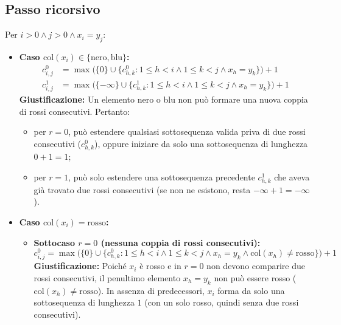 \subsection{Passo ricorsivo}
Per $i > 0 \land j > 0 \land x_i = y_j$:
\begin{itemize}
    \item \textbf{Caso $\text{col}(x_i) \in \{\text{nero}, \text{blu}\}$:}
    \begin{align*}
        c_{i,j}^0 &= \max \Big( \{0\} \cup \{ c_{h,k}^0 : 1 \le h < i \land 1 \le k < j \land x_h = y_k \} \Big) + 1 \\
        c_{i,j}^1 &= \max \Big( \{-\infty\} \cup \{ c_{h,k}^1 : 1 \le h < i \land 1 \le k < j \land x_h = y_k \} \Big) + 1
    \end{align*}
    \textbf{Giustificazione:} Un elemento nero o blu non può formare una nuova coppia di rossi consecutivi. Pertanto:
    \begin{itemize}
        \item per $r = 0$, può estendere qualsiasi sottosequenza valida priva di due rossi consecutivi ($c_{h,k}^0$), oppure iniziare da solo una sottosequenza di lunghezza $0 + 1 = 1$;
        \item per $r = 1$, può solo estendere una sottosequenza precedente $c_{h,k}^1$ che aveva già trovato due rossi consecutivi (se non ne esistono, resta $-\infty + 1 = -\infty$).
    \end{itemize}

    \item \textbf{Caso $\text{col}(x_i) = \text{rosso}$:}
    \begin{itemize}
        \item \textbf{Sottocaso $r = 0$ (nessuna coppia di rossi consecutivi):}
        \[
            c_{i,j}^0 = \max \Big( \{0\} \cup \{ c_{h,k}^0 : 1 \le h < i \land 1 \le k < j \land x_h = y_k \land \text{col}(x_h) \neq \text{rosso} \} \Big) + 1
        \]
        \textbf{Giustificazione:} Poiché $x_i$ è rosso e in $r = 0$ non devono comparire due rossi consecutivi, il penultimo elemento $x_h = y_k$ non può essere rosso ($\text{col}(x_h) \neq \text{rosso}$). In assenza di predecessori, $x_i$ forma da solo una sottosequenza di lunghezza $1$ (con un solo rosso, quindi senza due rossi consecutivi).


\end{itemize}
\end{itemize}
